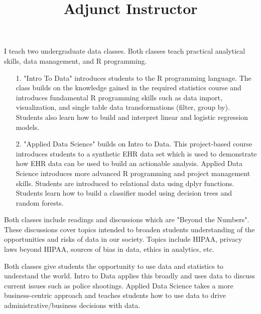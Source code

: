 \documentclass[line, mm, 10pt]{res}
\begin{document}
\begin{resume}


  \title{Adjunct Instructor}
  \begin{position}
    I teach two undergraduate data classes. Both classes teach practical
    analytical skills, data management, and R programming. 
    
    \begin{itemize}
      \item[1.] "Intro To Data" introduces students to the R programming
      language. The class builds on the knowledge gained in the required statistics course and introduces fundamental R programming skills such as data import, visualization, and single table data transformations (filter, group by). Students also learn how to build and interpret linear and logistic regression models.
      \item[2.] "Applied Data Science" builds on Intro to Data. This project-based course introduces students to a synthetic EHR data set which is used to demonstrate how EHR data can be used to build an actionable analysis. Applied Data Science introduces more advanced R programming and project management skills. Students are introduced to relational data using dplyr functions. Students learn how to build a classifier model using decision trees and random forests.
    \end{itemize}
  
    Both classes include readings and discussions which are "Beyond the
    Numbers". These discussions cover topics intended to broaden students
    understanding of the opportunities and risks of data in our society. Topics
    include HIPAA, privacy laws beyond HIPAA, sources of bias in data, ethics in
    analytics, etc.

    Both classes give students the opportunity to use data and statistics to understand the world. Intro to Data applies this broadly and uses data to discuss current issues such as police shootings. Applied Data Science takes a more business-centric approach and teaches students how to use data to drive administrative/business decisions with data.
  \end{position}



\end{resume}
\end{document}
